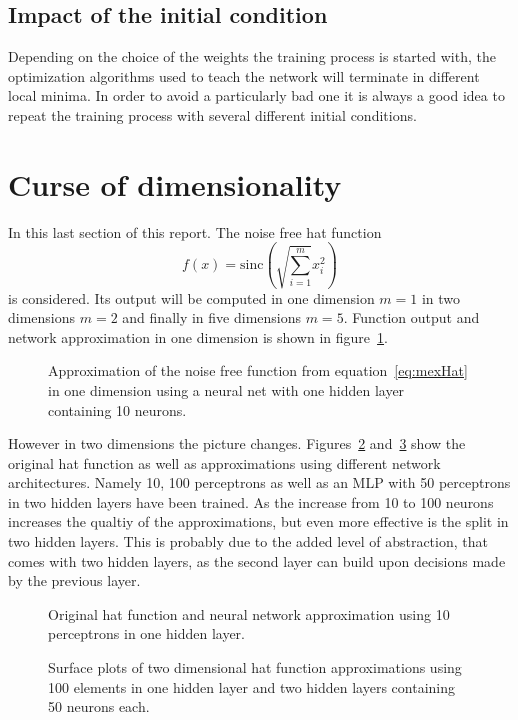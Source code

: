 \subsection{Impact of the initial condition}
Depending on the choice of the weights the training process is started with, the optimization algorithms used to teach the network will terminate in different local minima. In order to avoid a particularly bad one it is always a good idea to repeat the training process with several different initial conditions. 

\section{Curse of dimensionality}
In this last section of this report. The noise free hat function
\begin{equation}
f(x) = \text{sinc}(\sqrt{\sum_{i=1}^{m}} x_i^2)
\label{eq:mexHat}
\end{equation}
is considered. Its output will be computed in one dimension $m = 1$ in two dimensions $m = 2$ and finally in five dimensions $m = 5$. Function output and network approximation in one dimension is shown in figure~\ref{fig:dimCurse1}. 
\begin{figure}
\centering

\caption{Approximation of the noise free function from equation~\ref{eq:mexHat} in one dimension using a neural net with one hidden layer containing 10 neurons.}
\label{fig:dimCurse1}
\end{figure}
However in two dimensions the picture changes. Figures~\ref{fig:dimCurse2} and~\ref{fig:dimCurse3} show the original hat function as well as approximations using different network architectures. Namely 10, 100 perceptrons as well as an MLP with 50 perceptrons in two hidden layers have been trained. As the increase from 10 to 100 neurons increases the qualtiy of the approximations, but even more effective is the split in two hidden layers. This is probably due to the added level of abstraction, that comes with two hidden layers, as the second layer can build upon decisions made by the previous layer.
\begin{figure}
\centering


\caption{Original hat function and neural network approximation using 10 perceptrons in one hidden layer.}
\label{fig:dimCurse2}
\end{figure}
\begin{figure}
\centering


\caption{Surface plots of two dimensional hat function approximations using 100 elements in one hidden layer and two hidden layers containing 50 neurons each.}
\label{fig:dimCurse3}
\end{figure}
